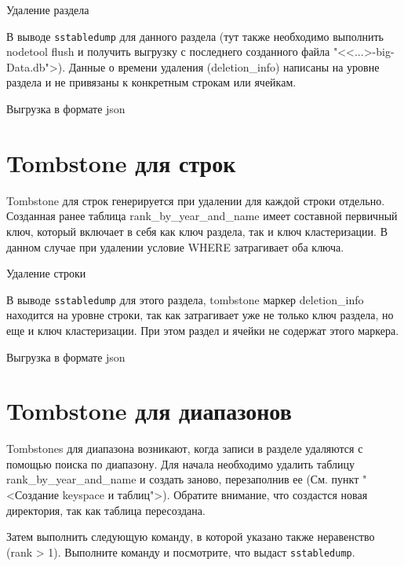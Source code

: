 \begin{image}
	\caption{Удаление раздела}
	\label{fig:cqlsh:partition:delete}
\end{image}

В выводе \texttt{sstabledump} для данного раздела (тут также необходимо
выполнить nodetool flush и получить выгрузку с последнего созданного
файла "<<...>-big-Data.db">). Данные о времени удаления (deletion\_info)
написаны на уровне раздела и не привязаны к конкретным строкам или
ячейкам.

\begin{image}
	\caption{Выгрузка в формате json}
	\label{fig:sstabledump:partition:delete}
\end{image}

\section{Tombstone для строк}

Tombstone для строк генерируется при удалении для каждой строки
отдельно. Созданная ранее таблица rank\_by\_year\_and\_name имеет
составной первичный ключ, который включает в себя как ключ раздела, так и
ключ кластеризации. В данном случае при удалении условие WHERE
затрагивает оба ключа.

\begin{image}
	\caption{Удаление строки}
	\label{fig:cqlsh:line:delete}
\end{image}

В выводе \texttt{sstabledump} для этого раздела,
tombstone маркер deletion\_info находится на уровне строки,
так как затрагивает уже не только ключ раздела, но еще и ключ кластеризации.
При этом раздел и ячейки не содержат этого маркера.

\begin{image}
	\caption{Выгрузка в формате json}
	\label{fig:sstabledump:line:delete}
\end{image}

\section{Tombstone для диапазонов}

Tombstones для диапазона возникают, когда записи в разделе удаляются с
помощью поиска по диапазону. Для начала необходимо удалить таблицу
rank\_by\_year\_and\_name и создать заново, перезаполнив ее (См. пункт
"<Создание keyspace и таблиц">). Обратите внимание, что создастся новая
директория, так как таблица пересоздана.\par
Затем выполнить следующую команду, в которой указано также
неравенство (rank > 1). Выполните команду и посмотрите, что выдаст
\texttt{sstabledump}.

